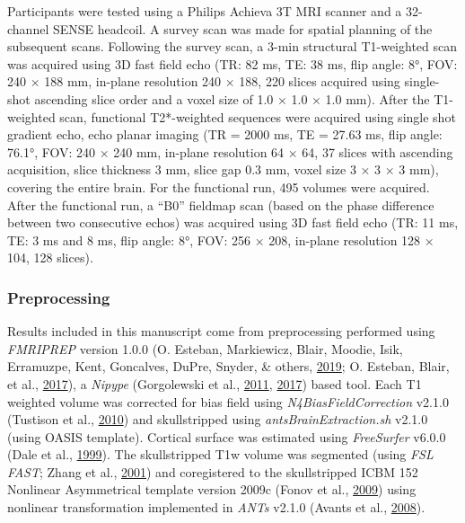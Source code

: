 \documentclass[12pt,american,a4paper,oneside,]{memoir} %
\begin{document}
Participants were tested using a Philips Achieva 3T MRI scanner and a 32-channel SENSE headcoil. A survey scan was made for spatial planning of the subsequent scans. Following the survey scan, a 3-min structural T1-weighted scan was acquired using 3D fast field echo (TR: 82 ms, TE: 38 ms, flip angle: 8°, FOV: 240 × 188 mm, in-plane resolution 240 × 188, 220 slices acquired using single-shot ascending slice order and a voxel size of 1.0 × 1.0 × 1.0 mm). After the T1-weighted scan, functional T2*-weighted sequences were acquired using single shot gradient echo, echo planar imaging (TR = 2000 ms, TE = 27.63 ms, flip angle: 76.1°, FOV: 240 × 240 mm, in-plane resolution 64 × 64, 37 slices with ascending acquisition, slice thickness 3 mm, slice gap 0.3 mm, voxel size 3 × 3 × 3 mm), covering the entire brain. For the functional run, 495 volumes were acquired. After the functional run, a ``B0'' fieldmap scan (based on the phase difference between two consecutive echos) was acquired using 3D fast field echo (TR: 11 ms, TE: 3 ms and 8 ms, flip angle: 8°, FOV: 256 × 208, in-plane resolution 128 × 104, 128 slices).

\hypertarget{morbid-curiosity-methods-imaging-details-preprocessing}{%
\subsubsection{Preprocessing}\label{morbid-curiosity-methods-imaging-details-preprocessing}}

Results included in this manuscript come from preprocessing performed using \emph{FMRIPREP} version 1.0.0 (O. Esteban, Markiewicz, Blair, Moodie, Isik, Erramuzpe, Kent, Goncalves, DuPre, Snyder, \& others, \protect\hyperlink{ref-esteban2019fmriprep}{2019}; O. Esteban, Blair, et al., \protect\hyperlink{ref-esteban_oscar_2017_1095198}{2017}), a \emph{Nipype} (Gorgolewski et al., \protect\hyperlink{ref-Gorgolewski2011-aa}{2011}, \protect\hyperlink{ref-gorgolewski_krzysztof_j_2017_581704}{2017}) based tool. Each T1 weighted volume was corrected for bias field using \emph{N4BiasFieldCorrection} v2.1.0 (Tustison et al., \protect\hyperlink{ref-Tustison2010-tk}{2010}) and skullstripped using \emph{antsBrainExtraction.sh} v2.1.0 (using OASIS template). Cortical surface was estimated using \emph{FreeSurfer} v6.0.0 (Dale et al., \protect\hyperlink{ref-Dale1999-rk}{1999}). The skullstripped T1w volume was segmented (using \emph{FSL FAST}; Zhang et al., \protect\hyperlink{ref-Zhang2001-wa}{2001}) and coregistered to the skullstripped ICBM 152 Nonlinear Asymmetrical template version 2009c (Fonov et al., \protect\hyperlink{ref-Fonov2009-sr}{2009}) using nonlinear transformation implemented in \emph{ANTs} v2.1.0 (Avants et al., \protect\hyperlink{ref-Avants2008-bv}{2008}).
\end{document}
